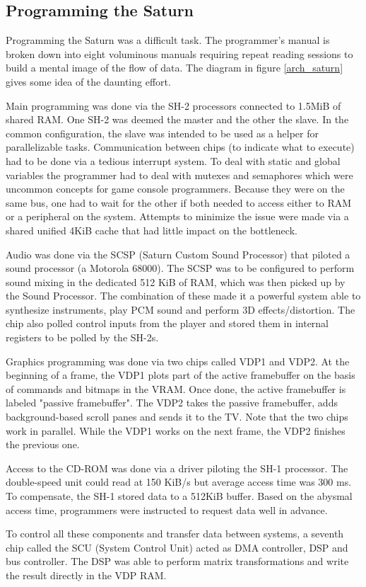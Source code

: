\subsection{Programming the Saturn}
Programming the Saturn was a difficult task. The programmer's manual is broken down into eight voluminous manuals requiring repeat reading sessions to build a mental image of the flow of data. The diagram in figure \ref{arch_saturn} gives some idea of the daunting effort.\\
\par
Main programming was done via the SH-2 processors connected to 1.5MiB of shared RAM. One SH-2 was deemed the master and the other the slave. In the common configuration, the slave was intended to be used as a helper for parallelizable tasks. Communication between chips (to indicate what to execute) had to be done via a tedious interrupt system. To deal with static and global variables the programmer had to deal with mutexes and semaphores which were uncommon concepts for game console programmers. Because they were on the same bus, one had to wait for the other if both needed to access either to RAM or a peripheral on the system. Attempts to minimize the issue were made via a shared unified 4KiB cache that had little impact on the bottleneck.\\
\par
Audio was done via the SCSP (Saturn Custom Sound Processor) that piloted a sound processor (a Motorola 68000). The SCSP was to be configured to perform sound mixing in the dedicated 512 KiB of RAM, which was then picked up by the Sound Processor. The combination of these made it a powerful system able to synthesize instruments, play PCM sound and perform 3D effects/distortion. The chip also polled control inputs from the player and stored them in internal registers to be polled by the SH-2s.\\
\par
Graphics programming was done via two chips called VDP1 and VDP2. At the beginning of a frame, the VDP1 plots part of the active framebuffer on the basis of commands and bitmaps in the VRAM. Once done, the active framebuffer is labeled "passive framebuffer". The VDP2 takes the passive framebuffer, adds background-based scroll panes and sends it to the TV. Note that the two chips work in parallel. While the VDP1 works on the next frame, the VDP2 finishes the previous one.\\
\par
Access to the CD-ROM was done via a driver piloting the SH-1 processor. The double-speed unit could read at 150 KiB/s but average access time was 300 ms. To compensate, the SH-1 stored data to a 512KiB buffer. Based on the abysmal access time, programmers were instructed to request data well in advance.\\ 
\par
To control all these components and transfer data between systems, a seventh chip called the SCU (System Control Unit) acted as DMA controller, DSP and bus controller. The DSP was able to perform matrix transformations and write the result directly in the VDP RAM.\\
\par


